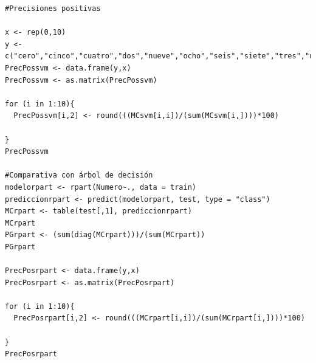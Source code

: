 \documentclass[11pt,a4paper]{report}
\begin{document}
\begin{itemize}
\begin{verbatim}
#Precisiones positivas

x <- rep(0,10)
y <- c("cero","cinco","cuatro","dos","nueve","ocho","seis","siete","tres","uno")
PrecPossvm <- data.frame(y,x)
PrecPossvm <- as.matrix(PrecPossvm)

for (i in 1:10){
  PrecPossvm[i,2] <- round(((MCsvm[i,i])/(sum(MCsvm[i,])))*100)
  
}
PrecPossvm

#Comparativa con árbol de decisión
modelorpart <- rpart(Numero~., data = train)
prediccionrpart <- predict(modelorpart, test, type = "class")
MCrpart <- table(test[,1], prediccionrpart)
MCrpart
PGrpart <- (sum(diag(MCrpart)))/(sum(MCrpart))
PGrpart

PrecPosrpart <- data.frame(y,x)
PrecPosrpart <- as.matrix(PrecPosrpart)

for (i in 1:10){
  PrecPosrpart[i,2] <- round(((MCrpart[i,i])/(sum(MCrpart[i,])))*100)
  
}
PrecPosrpart

\end{verbatim}


\end{itemize}
\end{document}
